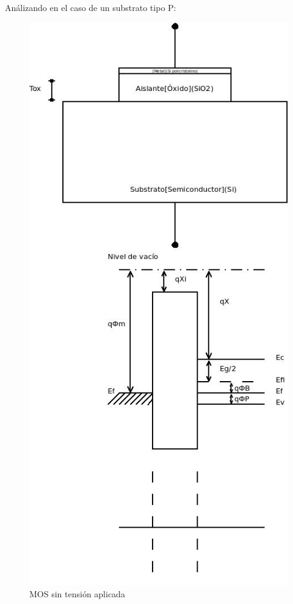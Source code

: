 \documentclass[oneside]{book}
\numberwithin{equation}{section}
\numberwithin{figure}{section}
\numberwithin{table}{section}
\begin{document}
			Análizando en el caso de un substrato tipo P:\\
		
			\begin{minipage}[t]{0.4\textwidth}
				\begin{figure}[H]
						\begin{center}
							\includegraphics[scale=0.4]{MOS-esquema.jpeg}
							\caption{MOS sin tensión aplicada}
						\end{center}
					\end{figure}	
				\end{minipage}
\end{document}
